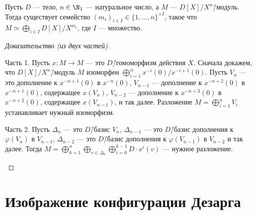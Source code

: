 \documentclass[
	extrafontsizes,
	11pt,
	hyphens,
]{memoir}
\begin{document}
\begin{theorem}
Пусть \(D\) --- тело, \(n \in \N_1\) --- натуральное число, а \(M\) --- \(D[X]/X^n\)\=/модуль.
Тогда существует семейство \((m_i)_{i \in I} \in \{1,\dots{},n\}^{\times I}\), такое что \(M \simeq \bigoplus_{i \in I} D[X]/X^{m_i}\), где \(I\) --- множество.
\end{theorem}

\begin{proof}[Доказательство (из двух частей)]
~\begin{proofdescription}

\item[Часть 1.]
Пусть \(x : M \to M\) --- это \(D\)\=/гомоморфизм действия \(X\).
Сначала докажем, что \(D[X]/X^n\)\=/модуль \(M\) изоморфен \(\bigoplus_{i = 1}^n x^{-i}(0) / x^{-i+1}(0)\).
Пусть \(V_n\) --- это дополнение к \(x^{-n+1}(0)\) в \(x^{-n}(0)\), \(V_{n-1}\) --- дополнение к \(x^{-n+2}(0)\) в \(x^{-n+1}(0)\), содержащее \(x(V_n)\), \(V_{n-2}\) --- дополнение к \(x^{-n+3}(0)\) в \(x^{-n+2}(0)\), содержащее \(x(V_{n-1})\), и так далее.
Разложение \(M = \bigoplus_{i = 1}^n V_i\) устанавливает нужный изоморфизм.

\item[Часть 2.]
Пусть \(\Delta_n\) --- это \(D\)\=/базис \(V_n\), \(\Delta_{n-1}\) --- это \(D\)\=/базис дополнения к \(\varphi(V_n)\) в \(V_{n-1}\), \(\Delta_{n-2}\) --- это \(D\)\=/базис дополнения к \(\varphi(V_{n-1})\) в \(V_{n-2}\) и так далее.
Тогда \(M = \bigoplus_{k = 1}^n \bigoplus_{v \in \Delta_k} \bigoplus_{i = 0}^{k-1} D \cdot x^i(v)\) --- нужное разложение.
\qedhere

\end{proofdescription}
\end{proof}


\section{Изображение конфигурации Дезарга}
\end{document}
